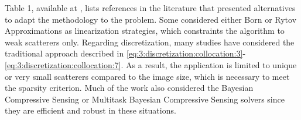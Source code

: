 			Table 1, available at \citep{oliveri2017compressive}, lists references in the literature that presented alternatives to adapt the methodology to the problem. Some considered either Born or Rytov Approximations as linearization strategies, which constraints the algorithm to weak scatterers only. Regarding discretization, many studies have considered the traditional approach described in \eqref{eq:3:discretization:collocation:3}-\eqref{eq:3:discretization:collocation:7}. As a result, the application is limited to unique or very small scatterers compared to the image size, which is necessary to meet the sparsity criterion. Much of the work also considered the Bayesian Compressive Sensing \citep{ji2008bayesian} or Multitask Bayesian Compressive Sensing \citep{ji2009multitask} solvers since they are efficient and robust in these situations.
			
